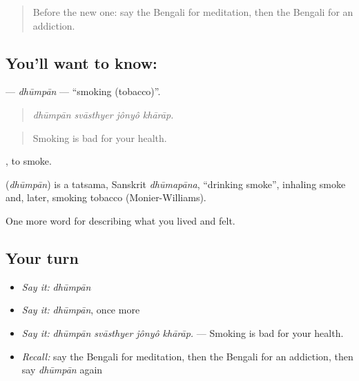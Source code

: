 \begin{quote}
Before the new one: say the Bengali for meditation, then the Bengali for an addiction.
\end{quote}

\subsection*{You'll want to know: }
\textbf{} — \emph{dhūmpān} — \textquotedblleft{}smoking (tobacco)\textquotedblright{}.

\begin{quote}
   
\end{quote}

\begin{quote}
\emph{dhūmpān svāsthyer jônyô khārāp.}
\end{quote}

\begin{quote}
Smoking is bad for your health.
\end{quote}

 , to smoke.

\begin{cousinweb}
\textbf{} (\emph{dhūmpān}) is a tatsama, Sanskrit \emph{dhūmapāna}, \textquotedblleft{}drinking smoke\textquotedblright{}, inhaling smoke and, later, smoking tobacco (Monier-Williams).
\end{cousinweb}

\begin{grammarlens}[title={What you've built}]
One more word for describing what you lived and felt.
\end{grammarlens}

\subsection*{Your turn}
\begin{itemize}
\raggedright
  \item \emph{Say it:} \emph{dhūmpān}
  \item \emph{Say it:} \emph{dhūmpān}, once more
  \item \emph{Say it:} \emph{dhūmpān svāsthyer jônyô khārāp.} — Smoking is bad for your health.
  \item \emph{Recall:} say the Bengali for meditation, then the Bengali for an addiction, then say \emph{dhūmpān} again
\end{itemize}

